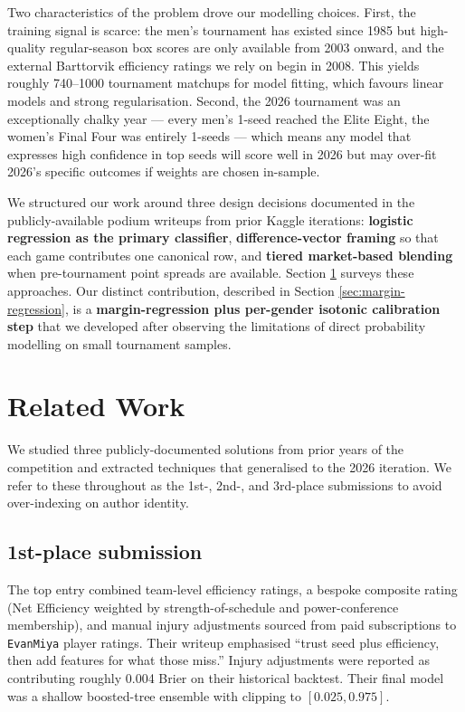 \documentclass[11pt, a4paper]{article}
\begin{document}
Two characteristics of the problem drove our modelling choices. First, the training signal is scarce: the men's tournament has existed since 1985 but high-quality regular-season box scores are only available from 2003 onward, and the external Barttorvik efficiency ratings we rely on begin in 2008. This yields roughly 740--1000 tournament matchups for model fitting, which favours linear models and strong regularisation. Second, the 2026 tournament was an exceptionally chalky year --- every men's 1-seed reached the Elite Eight, the women's Final Four was entirely 1-seeds --- which means any model that expresses high confidence in top seeds will score well in 2026 but may over-fit 2026's specific outcomes if weights are chosen in-sample.

We structured our work around three design decisions documented in the publicly-available podium writeups from prior Kaggle iterations: \textbf{logistic regression as the primary classifier}, \textbf{difference-vector framing} so that each game contributes one canonical row, and \textbf{tiered market-based blending} when pre-tournament point spreads are available. Section \ref{sec:related} surveys these approaches. Our distinct contribution, described in Section \ref{sec:margin-regression}, is a \textbf{margin-regression plus per-gender isotonic calibration step} that we developed after observing the limitations of direct probability modelling on small tournament samples.

\section{Related Work}
\label{sec:related}

We studied three publicly-documented solutions from prior years of the competition and extracted techniques that generalised to the 2026 iteration. We refer to these throughout as the 1st-, 2nd-, and 3rd-place submissions to avoid over-indexing on author identity.

\subsection{1st-place submission}
The top entry combined team-level efficiency ratings, a bespoke composite rating (Net Efficiency weighted by strength-of-schedule and power-conference membership), and manual injury adjustments sourced from paid subscriptions to \texttt{EvanMiya} player ratings. Their writeup emphasised ``trust seed plus efficiency, then add features for what those miss.'' Injury adjustments were reported as contributing roughly 0.004 Brier on their historical backtest. Their final model was a shallow boosted-tree ensemble with clipping to $[0.025, 0.975]$.
\end{document}

